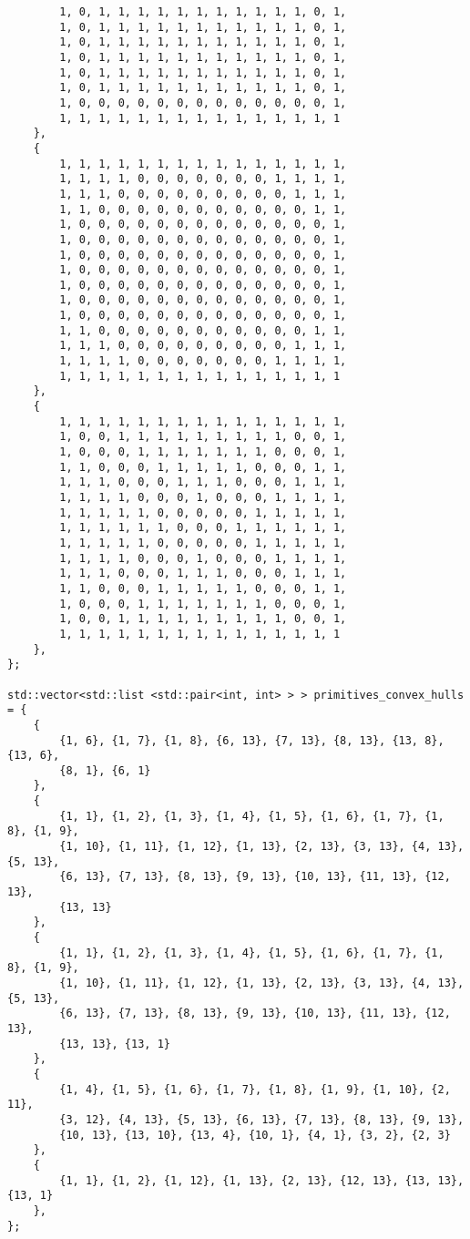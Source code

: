 \documentclass{report}
\begin{document}
\begin{lstlisting}
        1, 0, 1, 1, 1, 1, 1, 1, 1, 1, 1, 1, 1, 0, 1,
        1, 0, 1, 1, 1, 1, 1, 1, 1, 1, 1, 1, 1, 0, 1,
        1, 0, 1, 1, 1, 1, 1, 1, 1, 1, 1, 1, 1, 0, 1,
        1, 0, 1, 1, 1, 1, 1, 1, 1, 1, 1, 1, 1, 0, 1,
        1, 0, 1, 1, 1, 1, 1, 1, 1, 1, 1, 1, 1, 0, 1,
        1, 0, 1, 1, 1, 1, 1, 1, 1, 1, 1, 1, 1, 0, 1,
        1, 0, 0, 0, 0, 0, 0, 0, 0, 0, 0, 0, 0, 0, 1,
        1, 1, 1, 1, 1, 1, 1, 1, 1, 1, 1, 1, 1, 1, 1
    },
    {
        1, 1, 1, 1, 1, 1, 1, 1, 1, 1, 1, 1, 1, 1, 1,
        1, 1, 1, 1, 0, 0, 0, 0, 0, 0, 0, 1, 1, 1, 1,
        1, 1, 1, 0, 0, 0, 0, 0, 0, 0, 0, 0, 1, 1, 1,
        1, 1, 0, 0, 0, 0, 0, 0, 0, 0, 0, 0, 0, 1, 1,
        1, 0, 0, 0, 0, 0, 0, 0, 0, 0, 0, 0, 0, 0, 1,
        1, 0, 0, 0, 0, 0, 0, 0, 0, 0, 0, 0, 0, 0, 1,
        1, 0, 0, 0, 0, 0, 0, 0, 0, 0, 0, 0, 0, 0, 1,
        1, 0, 0, 0, 0, 0, 0, 0, 0, 0, 0, 0, 0, 0, 1,
        1, 0, 0, 0, 0, 0, 0, 0, 0, 0, 0, 0, 0, 0, 1,
        1, 0, 0, 0, 0, 0, 0, 0, 0, 0, 0, 0, 0, 0, 1,
        1, 0, 0, 0, 0, 0, 0, 0, 0, 0, 0, 0, 0, 0, 1,
        1, 1, 0, 0, 0, 0, 0, 0, 0, 0, 0, 0, 0, 1, 1,
        1, 1, 1, 0, 0, 0, 0, 0, 0, 0, 0, 0, 1, 1, 1,
        1, 1, 1, 1, 0, 0, 0, 0, 0, 0, 0, 1, 1, 1, 1,
        1, 1, 1, 1, 1, 1, 1, 1, 1, 1, 1, 1, 1, 1, 1
    },
    {
        1, 1, 1, 1, 1, 1, 1, 1, 1, 1, 1, 1, 1, 1, 1,
        1, 0, 0, 1, 1, 1, 1, 1, 1, 1, 1, 1, 0, 0, 1,
        1, 0, 0, 0, 1, 1, 1, 1, 1, 1, 1, 0, 0, 0, 1,
        1, 1, 0, 0, 0, 1, 1, 1, 1, 1, 0, 0, 0, 1, 1,
        1, 1, 1, 0, 0, 0, 1, 1, 1, 0, 0, 0, 1, 1, 1,
        1, 1, 1, 1, 0, 0, 0, 1, 0, 0, 0, 1, 1, 1, 1,
        1, 1, 1, 1, 1, 0, 0, 0, 0, 0, 1, 1, 1, 1, 1,
        1, 1, 1, 1, 1, 1, 0, 0, 0, 1, 1, 1, 1, 1, 1,
        1, 1, 1, 1, 1, 0, 0, 0, 0, 0, 1, 1, 1, 1, 1,
        1, 1, 1, 1, 0, 0, 0, 1, 0, 0, 0, 1, 1, 1, 1,
        1, 1, 1, 0, 0, 0, 1, 1, 1, 0, 0, 0, 1, 1, 1,
        1, 1, 0, 0, 0, 1, 1, 1, 1, 1, 0, 0, 0, 1, 1,
        1, 0, 0, 0, 1, 1, 1, 1, 1, 1, 1, 0, 0, 0, 1,
        1, 0, 0, 1, 1, 1, 1, 1, 1, 1, 1, 1, 0, 0, 1,
        1, 1, 1, 1, 1, 1, 1, 1, 1, 1, 1, 1, 1, 1, 1
    },
};

std::vector<std::list <std::pair<int, int> > > primitives_convex_hulls = {
    {
        {1, 6}, {1, 7}, {1, 8}, {6, 13}, {7, 13}, {8, 13}, {13, 8}, {13, 6},
        {8, 1}, {6, 1}
    },
    {
        {1, 1}, {1, 2}, {1, 3}, {1, 4}, {1, 5}, {1, 6}, {1, 7}, {1, 8}, {1, 9},
        {1, 10}, {1, 11}, {1, 12}, {1, 13}, {2, 13}, {3, 13}, {4, 13}, {5, 13},
        {6, 13}, {7, 13}, {8, 13}, {9, 13}, {10, 13}, {11, 13}, {12, 13},
        {13, 13}
    },
    {
        {1, 1}, {1, 2}, {1, 3}, {1, 4}, {1, 5}, {1, 6}, {1, 7}, {1, 8}, {1, 9},
        {1, 10}, {1, 11}, {1, 12}, {1, 13}, {2, 13}, {3, 13}, {4, 13}, {5, 13},
        {6, 13}, {7, 13}, {8, 13}, {9, 13}, {10, 13}, {11, 13}, {12, 13},
        {13, 13}, {13, 1}
    },
    {
        {1, 4}, {1, 5}, {1, 6}, {1, 7}, {1, 8}, {1, 9}, {1, 10}, {2, 11},
        {3, 12}, {4, 13}, {5, 13}, {6, 13}, {7, 13}, {8, 13}, {9, 13},
        {10, 13}, {13, 10}, {13, 4}, {10, 1}, {4, 1}, {3, 2}, {2, 3}
    },
    {
        {1, 1}, {1, 2}, {1, 12}, {1, 13}, {2, 13}, {12, 13}, {13, 13}, {13, 1}
    },
};


\end{lstlisting}
\end{document}
